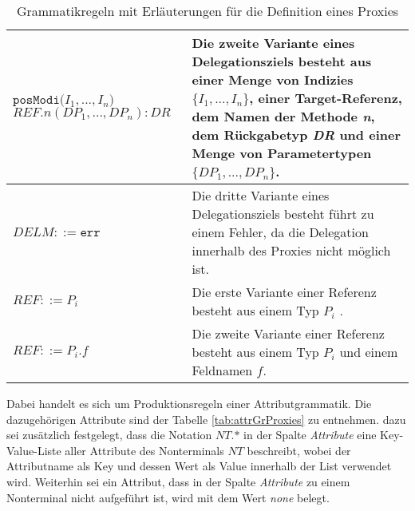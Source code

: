\documentclass[a4paper,12pt]{article}
\begin{document}
\begin{table}[H]
\begin{tabular}{|p{5cm}|p{9cm}|}
$\texttt{posModi(} \mathit{I_1},...,\mathit{I_n} \texttt{)}$\newline
$\mathit{REF}.\mathit{n(\mathit{DP_1},...,\mathit{DP_n}):DR} $  
& Die zweite Variante eines Delegationsziels besteht aus einer Menge von Indizies $\{\mathit{I_1},...,\mathit{I_n}\}$, einer Target-Referenz, dem Namen der Methode \emph{n}, dem Rückgabetyp \emph{DR} und einer Menge von Parametertypen $\{\mathit{DP_1},...,\mathit{DP_n}\}$.\\
\hline
$\mathit{DELM} ::= \texttt{err} $  
& Die dritte Variante eines Delegationsziels besteht führt zu einem Fehler, da die Delegation innerhalb des Proxies nicht möglich ist.\\
\hline
$\mathit{REF} ::= \mathit{P_i}$
& Die erste Variante einer Referenz besteht aus einem Typ $P_i$ .\\
\hline
$\mathit{REF} ::= \mathit{P_i}\texttt{.}\mathit{f}$
& Die zweite Variante einer Referenz besteht aus einem Typ $P_i$ und einem Feldnamen $f$.\\
\hline
\end{tabular}
\caption{Grammatikregeln mit Erläuterungen für die Definition eines Proxies}
 \label{tab:grProxies}
\end{table}
\noindent
Dabei handelt es sich um Produktionsregeln einer Attributgrammatik. Die dazugehörigen Attribute sind der Tabelle \ref{tab:attrGrProxies} zu entnehmen. dazu sei zusätzlich festgelegt, dass die Notation $\mathit{NT}\texttt{.}\text{*}$ in der Spalte \emph{Attribute} eine Key-Value-Liste aller Attribute des Nonterminals $\mathit{NT}$ beschreibt, wobei der Attributname als Key und dessen Wert als Value innerhalb der List verwendet wird. Weiterhin sei ein Attribut, dass in der Spalte \emph{Attribute} zu einem Nonterminal nicht aufgeführt ist, wird mit dem Wert \emph{none} belegt.
\end{document}
